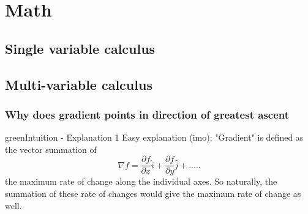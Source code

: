 \chapter{Math}
\section{Single variable calculus}
\section{Multi-variable calculus}
\subsection{Why does gradient points in direction of greatest ascent}
\begin{mybox}{green}{Intuition - Explanation 1}
    Easy explanation (imo): "Gradient" is defined as the vector summation of
    \begin{equation}
        \nabla{f}=\frac{\partial f}{\partial x} \hat{i}+\frac{\partial f}{\partial y}\hat{j}+ .....
    \end{equation}
    the maximum rate of change along the individual axes. So naturally, the summation of these rate of changes would give the maximum rate of change as well.
\end{mybox}


